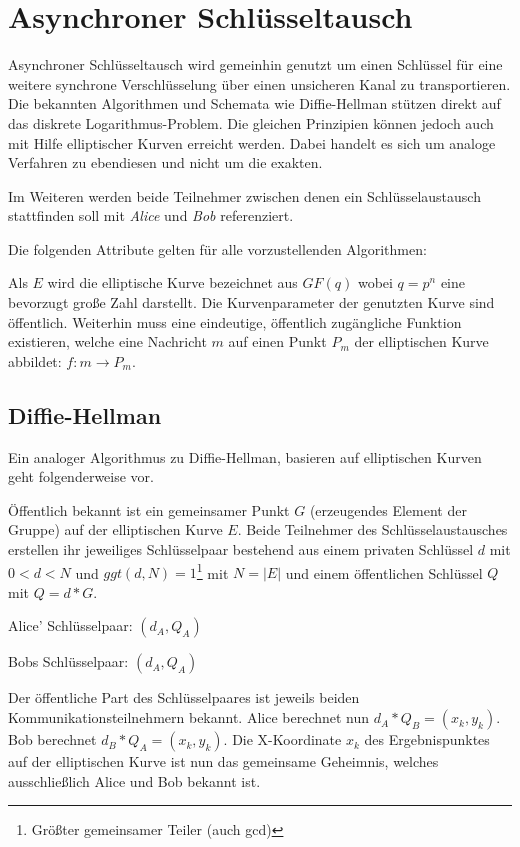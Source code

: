 \section{Asynchroner Schlüsseltausch}

Asynchroner Schlüsseltausch wird gemeinhin genutzt um einen Schlüssel für eine weitere synchrone Verschlüsselung über 
einen unsicheren Kanal zu transportieren. Die bekannten Algorithmen und Schemata wie Diffie-Hellman stützen direkt auf
das diskrete Logarithmus-Problem. Die gleichen Prinzipien können jedoch auch mit Hilfe elliptischer Kurven erreicht 
werden. Dabei handelt es sich um analoge Verfahren zu ebendiesen und nicht um die exakten.

Im Weiteren werden beide Teilnehmer zwischen denen ein Schlüsselaustausch stattfinden soll mit \textit{Alice} und \textit{Bob}
referenziert.

Die folgenden Attribute gelten für alle vorzustellenden Algorithmen:

Als $E$ wird die elliptische Kurve bezeichnet aus $GF(q)$ wobei $q = p^n$ eine bevorzugt große Zahl darstellt. 
Die Kurvenparameter der genutzten Kurve sind öffentlich.
Weiterhin muss eine eindeutige, öffentlich zugängliche Funktion existieren, welche eine Nachricht $m$ auf einen Punkt $P_m$ der 
elliptischen Kurve abbildet: $f:m \rightarrow P_m$.

\subsection{Diffie-Hellman}

Ein analoger Algorithmus zu Diffie-Hellman, basieren auf elliptischen Kurven geht folgenderweise vor.

Öffentlich bekannt ist ein gemeinsamer Punkt $G$ (erzeugendes Element der Gruppe) auf der elliptischen Kurve $E$.
Beide Teilnehmer des Schlüsselaustausches erstellen ihr jeweiliges Schlüsselpaar bestehend aus einem privaten Schlüssel
$d$ mit $0 < d < N$ und $ggt(d, N) = 1$\footnote{Größter gemeinsamer Teiler (auch gcd)} mit $N = |E|$ und einem öffentlichen 
Schlüssel $Q$ mit $Q = d * G$.

Alice' Schlüsselpaar: $(d_A, Q_A)$

Bobs Schlüsselpaar: $(d_A, Q_A)$

Der öffentliche Part des Schlüsselpaares ist jeweils beiden Kommunikationsteilnehmern bekannt.
Alice berechnet nun $d_A*Q_B = (x_k, y_k)$. Bob berechnet $d_B*Q_A = (x_k, y_k)$.
Die X-Koordinate $x_k$ des Ergebnispunktes auf der elliptischen Kurve ist nun das gemeinsame Geheimnis, welches
ausschließlich Alice und Bob bekannt ist.

